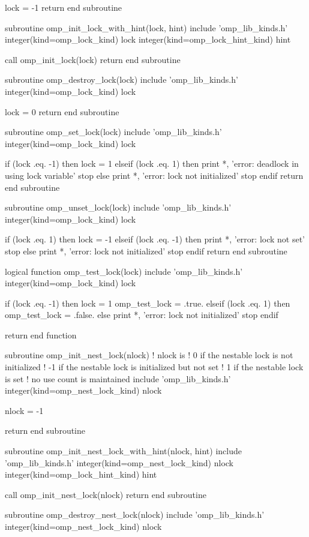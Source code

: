 {\begin{codepar}
  lock = -1
  return
end subroutine

subroutine omp\_init\_lock\_with\_hint(lock, hint)
  include 'omp\_lib\_kinds.h'
  integer(kind=omp\_lock\_kind) lock
  integer(kind=omp\_lock\_hint\_kind) hint

  call omp\_init\_lock(lock)
  return
end subroutine

subroutine omp\_destroy\_lock(lock)
  include 'omp\_lib\_kinds.h'
  integer(kind=omp\_lock\_kind) lock

  lock = 0
  return
end subroutine

subroutine omp\_set\_lock(lock)
  include 'omp\_lib\_kinds.h'
  integer(kind=omp\_lock\_kind) lock

  if (lock .eq. -1) then
    lock = 1
  elseif (lock .eq. 1) then
    print *, 'error: deadlock in using lock variable'
    stop
  else
    print *, 'error: lock not initialized'
    stop
  endif
  return
end subroutine

subroutine omp\_unset\_lock(lock)
  include 'omp\_lib\_kinds.h'
  integer(kind=omp\_lock\_kind) lock

  if (lock .eq. 1) then
    lock = -1
  elseif (lock .eq. -1) then
    print *, 'error: lock not set'
    stop
  else
    print *, 'error: lock not initialized'
    stop
  endif
  return
end subroutine

logical function omp\_test\_lock(lock)
  include 'omp\_lib\_kinds.h'
  integer(kind=omp\_lock\_kind) lock

  if (lock .eq. -1) then
    lock = 1
    omp\_test\_lock = .true.
  elseif (lock .eq. 1) then
    omp\_test\_lock = .false.
  else
    print *, 'error: lock not initialized'
    stop
  endif

  return
end function

subroutine omp\_init\_nest\_lock(nlock)
  ! nlock is 
  ! 0 if the nestable lock is not initialized
  ! -1 if the nestable lock is initialized but not set
  ! 1 if the nestable lock is set
  ! no use count is maintained
  include 'omp\_lib\_kinds.h'
  integer(kind=omp\_nest\_lock\_kind) nlock

  nlock = -1

  return
end subroutine

subroutine omp\_init\_nest\_lock\_with\_hint(nlock, hint)
  include 'omp\_lib\_kinds.h'
  integer(kind=omp\_nest\_lock\_kind) nlock
  integer(kind=omp\_lock\_hint\_kind) hint
  
  call omp\_init\_nest\_lock(nlock)
  return
end subroutine

subroutine omp\_destroy\_nest\_lock(nlock)
  include 'omp\_lib\_kinds.h'
  integer(kind=omp\_nest\_lock\_kind) nlock


\end{codepar}}
